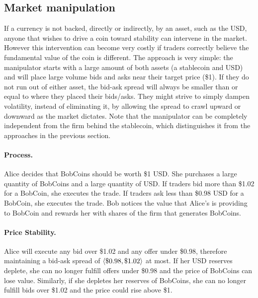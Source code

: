 

\subsection{Market manipulation}
\label{sec:board}

If a currency is not backed, directly or indirectly, by an asset, such as the USD, anyone that wishes to drive a coin toward stability can intervene in the market. However this intervention can become very costly if traders correctly believe the fundamental value of the coin is different. The approach is very simple: the manipulator starts with a large amount of both assets (\eg a stablecoin and USD) and will place large volume bids and asks near their target price (\eg \$1). If they do not run out of either asset, the bid-ask spread will always be smaller than or equal to where they placed their bids/asks. They might strive to simply dampen volatility, instead of eliminating it, by allowing the spread to crawl upward or downward as the market dictates. Note that the manipulator can be completely independent from the firm behind the stablecoin, which distinguishes it from the approaches in the previous section.

\paragraph{Process.} Alice decides that BobCoins should be worth \$1 USD. She purchases a large quantity of BobCoins and a large quantity of USD. If traders bid more than \$1.02 for a BobCoin, she executes the trade. If traders ask less than \$0.98 USD for a BobCoin, she executes the trade. Bob notices the value that Alice's is providing to BobCoin and rewards her with shares of the firm that generates BobCoins.

\paragraph{Price Stability.} Alice will execute any bid over \$1.02 and any offer under \$0.98, therefore maintaining a bid-ask spread of $\left \langle \$0.98, \$1.02 \right \rangle$ at most. If her USD reserves deplete, she can no longer fulfill offers under \$0.98 and the price of BobCoins can lose value. Similarly, if she depletes her reserves of BobCoins, she can no longer fulfill bids over \$1.02 and the price could rise above \$1. 

